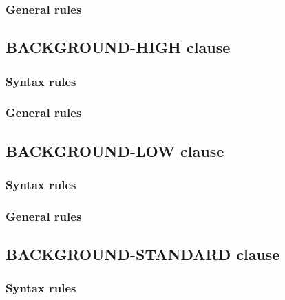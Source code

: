 \subsubsection{General rules}

\subsection{BACKGROUND-HIGH clause}

\begin{syntax}[\miscextcolour]
\end{syntax}

\subsubsection{Syntax rules}

\subsubsection{General rules}

\subsection{BACKGROUND-LOW clause}

\begin{syntax}[\miscextcolour]
\end{syntax}

\subsubsection{Syntax rules}

\subsubsection{General rules}

\subsection{BACKGROUND-STANDARD clause}

\begin{syntax}[\miscextcolour]
\end{syntax}

\subsubsection{Syntax rules}

